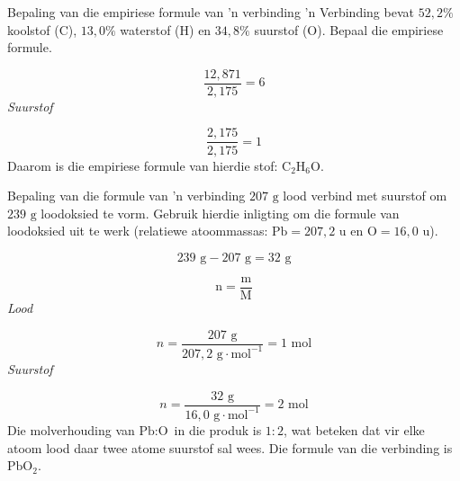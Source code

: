 \begin{wex}{Bepaling van die empiriese formule van  'n verbinding}{
  'n Verbinding bevat $52,2\%$ koolstof ($\text{C}$), $13,0\%$ waterstof ($\text{H}$) en $34,8\%$ suurstof ($\text{O}$). Bepaal die empiriese formule.      
}
{      \label{m38712*id281223}\nopagebreak\noindent{}
        
    \begin{equation*}
    \frac{12,871}{2,175}=6
      \end{equation*}
      \label{m38712*id281254}
        \textsl{Suurstof}
      
      \label{m38712*id281261}\nopagebreak\noindent{}
        
    \begin{equation*}
    \frac{2,175}{2,175}=1
      \end{equation*}
      \label{m38712*id281292}Daarom is die empiriese formule van hierdie stof: ${\text{C}}_{2}{\text{H}}_{6}\text{O}$.
}
    \end{wex}
    \noindent
\label{m38712*secfhsst!!!underscore!!!id1235}
      \noindent
      \begin{wex}{Bepaling van die formule van  'n verbinding}{
$207 \text{ g}$ lood verbind met suurstof om $239 \text{ g}$ loodoksied te vorm. Gebruik hierdie inligting om
    die formule van loodoksied uit te werk (relatiewe atoommassas: $\text{Pb}=207,2 \text{ u}$ en $\text{O} = 16,0 \text{ u}$).
}
{
      \label{m38712*id281379}\nopagebreak\noindent{}
    \begin{equation*}
    239 \text{ g}-207 \text{ g}=32 \text{ g}
      \end{equation*}
      \label{m38712*id281407}\nopagebreak\noindent{}
        
    \begin{equation*}
    \text{n}=\frac{\text{m}}{\text{M}}
      \end{equation*}
      \label{m38712*id281427}
        \textsl{Lood}
       
      \label{m38712*id281433}\nopagebreak\noindent{}
        
    \begin{equation*}
    n = \frac{207 \text{ g}}{207,2 \text{ g} \cdot \text{mol}^{-1}}=1 \text{ mol}
      \end{equation*}
      \label{m38712*id281460}
        \textsl{Suurstof}
    
      \label{m38712*id281467}\nopagebreak\noindent{}
        
    \begin{equation*}
    n= \frac{32 \text{ g}}{16,0 \text{ g} \cdot \text{mol}^{-1}}=2 \text{ mol}
      \end{equation*}
      \label{m38712*id281498}Die molverhouding van $\text{Pb}:\text{O}$ in die produk is $1:2$, wat beteken dat vir elke atoom lood daar  twee atome suurstof sal wees. Die formule van die verbinding is $\text{PbO}{}_{2}$. 
}
    \end{wex}
